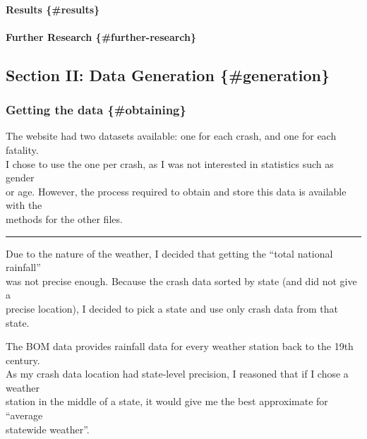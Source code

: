 \documentclass{article}
\begin{document}
\paragraph{Results \{\#results\}}\label{results-results}

\paragraph{Further Research
\{\#further-research\}}\label{further-research-further-research}

\subsection{Section II: Data Generation
\{\#generation\}}\label{section-ii-data-generation-generation}

\subsubsection{Getting the data
\{\#obtaining\}}\label{getting-the-data-obtaining}

The website had two datasets available: one for each crash, and one for
each fatality.\\
I chose to use the one per crash, as I was not interested in statistics
such as gender\\
or age. However, the process required to obtain and store this data is
available with the\\
methods for the other files.

\begin{center}\rule{0.5\linewidth}{\linethickness}\end{center}

Due to the nature of the weather, I decided that getting the ``total
national rainfall''\\
was not precise enough. Because the crash data sorted by state (and did
not give a\\
precise location), I decided to pick a state and use only crash data
from that state.

The BOM data provides rainfall data for every weather station back to
the 19th century.\\
As my crash data location had state-level precision, I reasoned that if
I chose a weather\\
station in the middle of a state, it would give me the best approximate
for ``average\\
statewide weather''.
\end{document}
